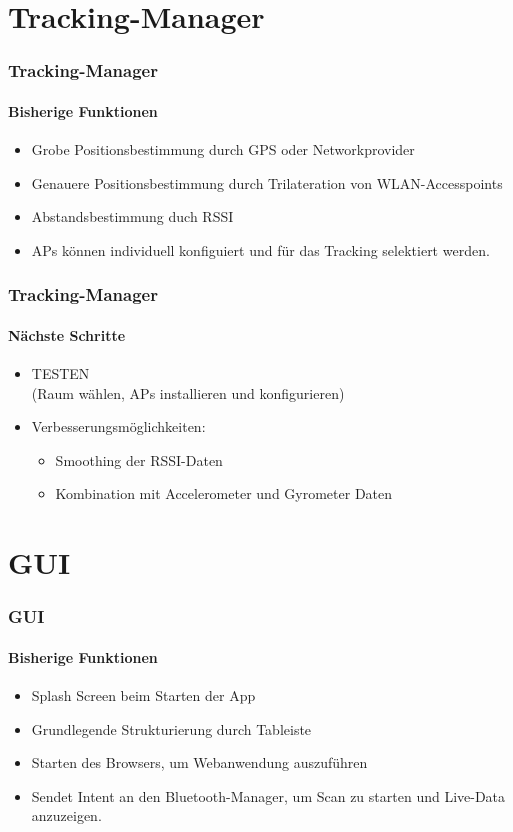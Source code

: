 \documentclass{beamer}
\begin{document}
\section{Tracking-Manager}



\begin{frame}
\frametitle{Tracking-Manager}
\framesubtitle{Bisherige Funktionen}
\begin{itemize}
  \item Grobe Positionsbestimmung durch GPS oder Networkprovider
  \item	Genauere Positionsbestimmung durch Trilateration von WLAN-Accesspoints
  \item	Abstandsbestimmung duch RSSI
  \item	APs k\"onnen individuell konfiguiert und f\"ur das Tracking selektiert werden.
\end{itemize}
\end{frame}

\begin{frame}
\frametitle{Tracking-Manager}
\framesubtitle{N\"achste Schritte}
\begin{itemize}
  \item TESTEN\\
  		(Raum w\"ahlen, APs installieren und konfigurieren)
  \item Verbesserungsm\"oglichkeiten:
  		\begin{itemize}
  		\item	Smoothing der RSSI-Daten
  		\item	Kombination mit Accelerometer und Gyrometer Daten
  		\end{itemize}
\end{itemize}
\end{frame}

\section{GUI}


\begin{frame}
\frametitle{GUI}
\framesubtitle{Bisherige Funktionen}
\begin{itemize}
  \item Splash Screen beim Starten der App
  \item Grundlegende Strukturierung durch Tableiste
  \item Starten des Browsers, um Webanwendung auszuf\"uhren
  \item Sendet Intent an den Bluetooth-Manager, um Scan zu starten und Live-Data anzuzeigen.
\end{itemize}
\end{frame}
\end{document}
